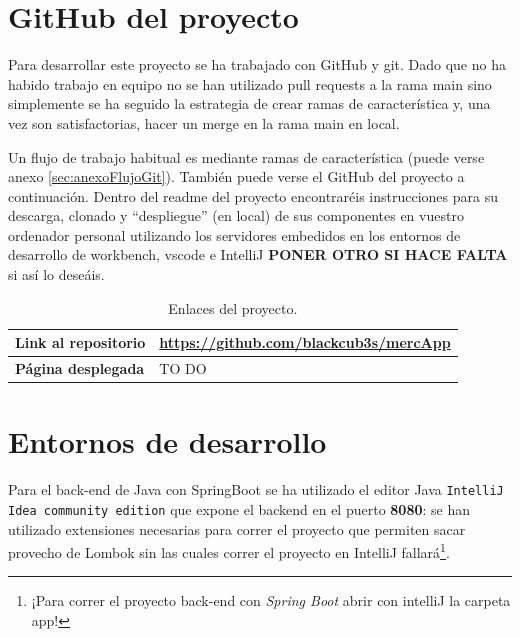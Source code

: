 \documentclass[a4paper,12pt]{report}
\begin{document}
	
	
				
			\section{GitHub del proyecto}
			
				Para desarrollar este proyecto se ha trabajado con GitHub y git. Dado que no ha habido trabajo en equipo no se han utilizado pull requests a la rama main sino simplemente se ha seguido la estrategia de crear ramas de característica y, una vez son satisfactorias, hacer un merge en la rama main en local.
				
				Un flujo de trabajo habitual es mediante ramas de característica (puede verse anexo \ref{sec:anexoFlujoGit}). También puede verse el GitHub del proyecto a continuación. Dentro del readme del proyecto encontraréis instrucciones para su descarga, clonado y ``despliegue'' (en local) de sus componentes en vuestro ordenador personal utilizando los servidores embedidos en los entornos de desarrollo de workbench, vscode e IntelliJ \textbf{PONER OTRO SI HACE FALTA} si así lo deseáis.
			

			
			
			
			
			
			
			
			
			
			
			
			
			\begin{table}[h!]
				\centering
				\begin{tabular}{|p{3.8cm}|p{11cm}|}
					\hline
					\textbf{Link al repositorio} & \href{https://github.com/blackcub3s/mercApp}{https://github.com/blackcub3s/mercApp} \\
					\hline
					\textbf{Página desplegada} & TO DO \\ %
					\hline
				\end{tabular}
				\caption{Enlaces  del proyecto.}
				\label{tabla:enlaces}
			\end{table}

	
	
		
			\section{Entornos de desarrollo}
			
				Para el back-end de Java con SpringBoot se ha utilizado el editor Java \texttt{IntelliJ Idea community edition} que expone el backend en el puerto\textbf{ 8080}: se han utilizado extensiones necesarias para correr el proyecto que permiten sacar provecho de Lombok sin las cuales correr el proyecto en IntelliJ fallará\footnote{¡Para correr el proyecto back-end con\textit{ Spring Boot} abrir con intelliJ la carpeta app!}.
				
\end{document}
